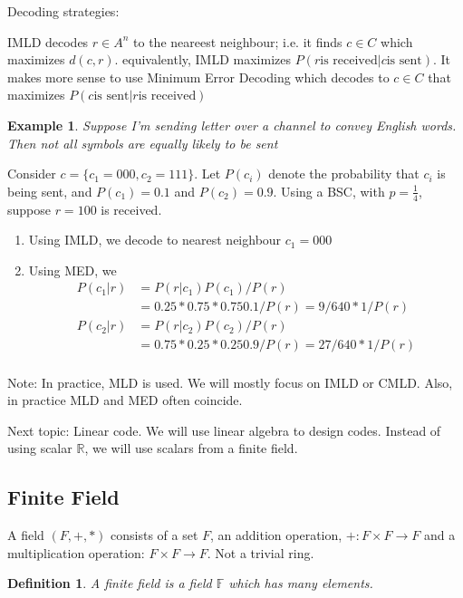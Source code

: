 \documentclass{article}
\newtheorem{defn}{Definition}
\newtheorem{eg}{Example}
\begin{document}
Decoding strategies:

IMLD decodes $r\in A^n$ to the neareest neighbour; i.e. it finds
$c\in C$ which maximizes $d(c, r)$. equivalently, IMLD maximizes
$P(r \text{is received} | c \text{is sent})$. It makes more sense
to use Minimum Error Decoding which decodes to $c\in C$ that maximizes
$P(c \text{is sent} | r \text{is received})$

\begin{eg}
   Suppose I'm sending letter over a channel to convey English words. Then
    not all symbols are equally likely to be sent
\end{eg}

Consider $c = \{c_1 = 000, c_2 = 111\}$. Let $P(c_i)$ denote the probability
that $c_i$ is being sent, and $P(c_1) = 0.1$ and $P(c_2) = 0.9$.
Using a BSC, with $p = \frac{1}{4}$, suppose $r=100$ is received.

\begin{enumerate}
    \item Using IMLD, we decode to nearest neighbour $c_1 = 000$
    \item Using MED, we
        \begin{align*}
            P(c_1| r) &= P(r|c_1)P(c_1)/P(r)\\
            &= 0.25*0.75*0.75 0.1/P(r) = 9/640 * 1/P(r)\\
            P(c_2| r) &= P(r|c_2)P(c_2)/P(r)\\
            &= 0.75*0.25*0.25 0.9/P(r) = 27/640 * 1/P(r)\\
        \end{align*}
\end{enumerate}

Note: In practice, MLD is used. We will mostly focus on IMLD or CMLD.
Also, in practice MLD and MED often coincide.

Next topic: Linear code.
We will use linear algebra to design codes. Instead of using scalar
$\mathbb{R}$, we will use scalars from a finite field.

\subsection{Finite Field}
A field $(F, +, *)$ consists of a set $F$, an addition operation,
$+: F\times F\rightarrow F$ and a multiplication operation: $F\times F\rightarrow F$.
Not a trivial ring.

\begin{defn}
    A finite field is a field $\mathbb{F}$ which has many elements.
\end{defn}
\end{document}
